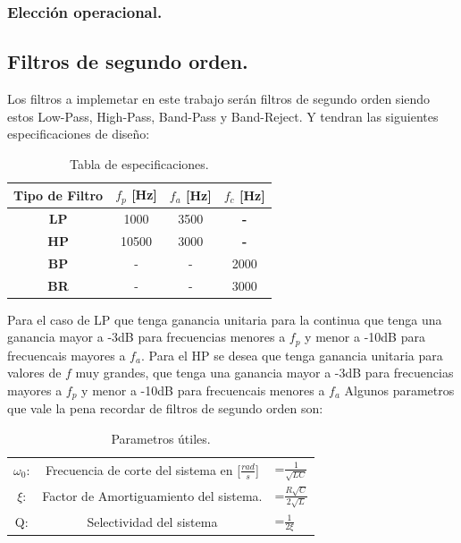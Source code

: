 \documentclass[a4paper]{article}
\begin{document}
\subsubsection{Elección operacional.}

 \flushleft
\subsection{Filtros de segundo orden.}
Los filtros a implemetar en este trabajo serán filtros de segundo orden siendo estos Low-Pass, High-Pass, Band-Pass y Band-Reject. Y tendran las siguientes especificaciones de diseño:
\begin{table}[H]
\begin{center}
\begin{tabular}{|c|c|c|c|}
\hline
\textbf{Tipo de Filtro} & \textbf{$f_p$ [Hz]} & \textbf{$f_a$ [Hz]} & \textbf{$f_c$ [Hz]} \\ \hline
\textbf{LP}             & 1000                & 3500                & \textbf{-}          \\ \hline
\textbf{HP}             & 10500               & 3000                & \textbf{-}          \\ \hline
\textbf{BP}             & -                   & -                   & 2000                \\ \hline
\textbf{BR}             & -                   & -                   & 3000                \\ \hline
\end{tabular}
\caption{Tabla de especificaciones.}
\label{tab:specs}
\end{center}
\end{table}
Para el caso de LP que tenga ganancia unitaria para la continua que tenga una ganancia mayor a -3dB para frecuencias menores a $f_p$ y menor a -10dB para frecuencais mayores a $f_a$. Para el HP se desea que tenga ganancia unitaria para valores de $f$ muy grandes, que tenga una ganancia mayor a -3dB para frecuencias mayores a $f_p$ y menor a -10dB para frecuencais menores a $f_a$
Algunos parametros que vale la pena recordar de filtros de segundo orden son:
\begin{table}[H]
\begin{center}
\begin{tabular}{c|cl}
$\omega_0$: & Frecuencia de corte del sistema en [$\frac{rad}{s}$] & =$\frac{1}{\sqrt{LC}}$         \\
$\xi$:      & Factor de Amortiguamiento del sistema.               & =$\frac{R\sqrt{C}}{2\sqrt{L}}$ \\
Q:          & Selectividad del sistema                             & =$\frac{1}{2\xi}$             
\end{tabular}
\end{center}
\caption{Parametros útiles.}
\label{tab:utils}
\end{table}
\end{document}
